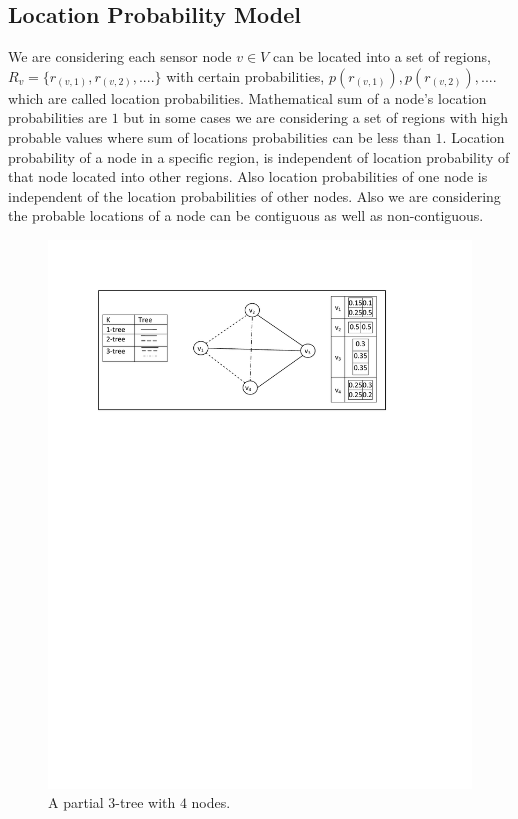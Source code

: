 \documentclass[11pt]{article}
\begin{document}
\subsection{Location Probability Model}
\label{subsec:LPM}
We are considering each sensor node $v\in V$ can be located into a set of regions, $R_v=\{r_{(v,1)},r_{(v,2)},....\}$ with certain probabilities, $p(r_{(v,1)}),p(r_{(v,2)}),....$ which are called location probabilities. Mathematical sum of a node's  location probabilities are $1$ but in some cases we are considering a set of regions with high probable values where sum of locations probabilities can be less than $1$. Location probability of a node in a specific region, is independent of location probability of that node located into other regions. Also location probabilities of one node is independent of the location probabilities of other nodes. Also we are considering the probable locations of a node can be contiguous as well as non-contiguous.\\

\begin{figure}[h]
\centering
\includegraphics[width=6 in, height=2.5 in]{First_Example.pdf}
 \caption{A partial \(3\)-tree with \(4\) nodes.
}
\end{figure}
 
\end{document}
